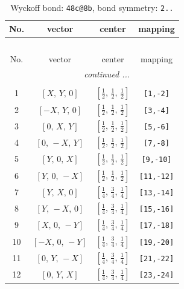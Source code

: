 \documentclass[fleqn,8pt]{jsarticle}
\begin{document}
\begin{longtable}{cccc}
\caption{Wyckoff bond: {\tt 48c@8b}, bond symmetry: {\tt 2..}}
 \\
 \hline \hline
No. & vector & center & mapping \\ \hline \endfirsthead

\multicolumn{3}{l}{\tablename\ \thetable{}} \\
 \hline \hline
No. & vector & center & mapping \\ \hline \endhead

 \hline \hline
\multicolumn{3}{r}{\footnotesize\it continued ...} \\ \endfoot

 \hline \hline
\multicolumn{3}{r}{} \\ \endlastfoot

1 & $\left[ X,\, Y,\, 0 \right]$ & $\left[ \frac{1}{2},\, \frac{1}{2},\, \frac{1}{2} \right]$ & {\tt [1,-2]} \\ \hline
2 & $\left[ - X,\, Y,\, 0 \right]$ & $\left[ \frac{1}{2},\, \frac{1}{2},\, \frac{1}{2} \right]$ & {\tt [3,-4]} \\ \hline
3 & $\left[ 0,\, X,\, Y \right]$ & $\left[ \frac{1}{2},\, \frac{1}{2},\, \frac{1}{2} \right]$ & {\tt [5,-6]} \\ \hline
4 & $\left[ 0,\, - X,\, Y \right]$ & $\left[ \frac{1}{2},\, \frac{1}{2},\, \frac{1}{2} \right]$ & {\tt [7,-8]} \\ \hline
5 & $\left[ Y,\, 0,\, X \right]$ & $\left[ \frac{1}{2},\, \frac{1}{2},\, \frac{1}{2} \right]$ & {\tt [9,-10]} \\ \hline
6 & $\left[ Y,\, 0,\, - X \right]$ & $\left[ \frac{1}{2},\, \frac{1}{2},\, \frac{1}{2} \right]$ & {\tt [11,-12]} \\ \hline
7 & $\left[ Y,\, X,\, 0 \right]$ & $\left[ \frac{1}{4},\, \frac{3}{4},\, \frac{1}{4} \right]$ & {\tt [13,-14]} \\ \hline
8 & $\left[ Y,\, - X,\, 0 \right]$ & $\left[ \frac{1}{4},\, \frac{3}{4},\, \frac{1}{4} \right]$ & {\tt [15,-16]} \\ \hline
9 & $\left[ X,\, 0,\, - Y \right]$ & $\left[ \frac{1}{4},\, \frac{3}{4},\, \frac{1}{4} \right]$ & {\tt [17,-18]} \\ \hline
10 & $\left[ - X,\, 0,\, - Y \right]$ & $\left[ \frac{1}{4},\, \frac{3}{4},\, \frac{1}{4} \right]$ & {\tt [19,-20]} \\ \hline
11 & $\left[ 0,\, Y,\, - X \right]$ & $\left[ \frac{1}{4},\, \frac{3}{4},\, \frac{1}{4} \right]$ & {\tt [21,-22]} \\ \hline
12 & $\left[ 0,\, Y,\, X \right]$ & $\left[ \frac{1}{4},\, \frac{3}{4},\, \frac{1}{4} \right]$ & {\tt [23,-24]} \\
\end{longtable}
\end{document}
